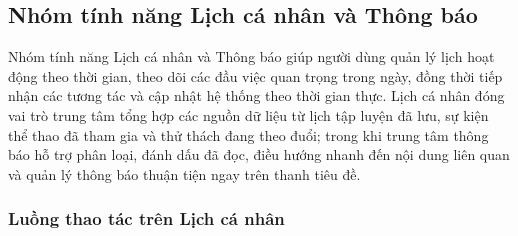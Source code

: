 \subsection{Nhóm tính năng Lịch cá nhân và Thông báo}
\label{subsec:impl_calendar_notification}

Nhóm tính năng Lịch cá nhân và Thông báo giúp người dùng quản lý lịch hoạt động theo thời gian, theo dõi các đầu việc quan trọng trong ngày, đồng thời tiếp nhận các tương tác và cập nhật hệ thống theo thời gian thực. Lịch cá nhân đóng vai trò trung tâm tổng hợp các nguồn dữ liệu từ lịch tập luyện đã lưu, sự kiện thể thao đã tham gia và thử thách đang theo đuổi; trong khi trung tâm thông báo hỗ trợ phân loại, đánh dấu đã đọc, điều hướng nhanh đến nội dung liên quan và quản lý thông báo thuận tiện ngay trên thanh tiêu đề.

\subsubsection{Luồng thao tác trên Lịch cá nhân}
